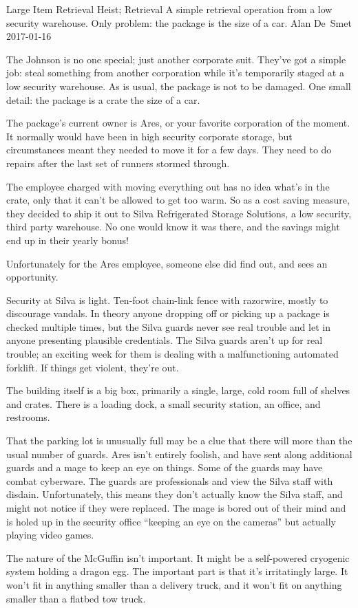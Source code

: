 \begin{scenario}[CC-BY-SA-4.0]
	{Large Item Retrieval}
	{Heist; Retrieval}
	{A simple retrieval operation from a low security warehouse. Only problem: the package is the size of a car.}
	{Alan De~Smet}
	{2017-01-16}
	{}

 The Johnson is no one special; just another corporate suit.  They've got a simple job: steal something from another corporation while it's temporarily staged at a low security warehouse.  As is usual, the package is not to be damaged.  One small detail: the package is a crate the size of a car.

\synopsis  The package's current owner is Ares, or your favorite corporation of the moment.  It normally would have been in high security corporate storage, but circumstances meant they needed to move it for a few days. They need to do repairs after the last set of runners stormed through.

The employee charged with moving everything out has no idea what's in the crate, only that it can't be allowed to get too warm. So as a cost saving measure, they decided to ship it out to Silva Refrigerated Storage Solutions, a low security, third party warehouse.  No one would know it was there, and the savings might end up in their yearly bonus!

Unfortunately for the Ares employee, someone else did find out, and sees an opportunity.


\notes  Security at Silva is light. Ten-foot chain-link fence with razorwire, mostly to discourage vandals.  In theory anyone dropping off or picking up a package is checked multiple times, but the Silva guards never see real trouble and let in anyone presenting plausible credentials.  The Silva guards aren't up for real trouble; an exciting week for them is dealing with a malfunctioning automated forklift. If things get violent, they're out.

The building itself is a big box, primarily a single, large, cold room full of shelves and crates. There is a loading dock, a small security station, an office, and restrooms.

That the parking lot is unusually full may be a clue that there will more than the usual number of guards.
Ares isn't entirely foolish, and have sent along additional guards and a mage to keep an eye on things.  Some of the guards may have combat cyberware.  The guards are professionals and view the Silva staff with disdain. Unfortunately, this means they don't actually know the Silva staff, and might not notice if they were replaced.  The mage is bored out of their mind and is holed up in the security office ``keeping an eye on the cameras'' but actually playing video games.

The nature of the McGuffin isn't important. It might be a self-powered cryogenic system holding a dragon egg.  The important part is that it's irritatingly large.  It won't fit in anything smaller than a delivery truck, and it won't fit on anything smaller than a flatbed tow truck.


\end{scenario}
